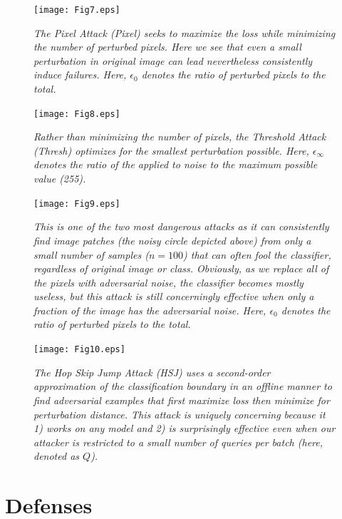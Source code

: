 \documentclass[journal]{IEEEtran}
\newcommand{\cm}[1]{\textit{{\color{blue}#1}}}
\begin{document}
\begin{figure}[] 
          \texttt{[image: Fig7.eps]}
        \caption{ \cm{The Pixel Attack (Pixel) seeks to maximize the loss while minimizing the number of perturbed pixels. Here we see that even a small  perturbation in original image can lead nevertheless consistently induce failures.  Here, $\epsilon_0$ denotes the ratio of perturbed pixels to the total.}}
        \label{fig:Pixel}
          \texttt{[image: Fig8.eps]}
        \caption{ \cm{Rather than minimizing the number of pixels, the Threshold Attack (Thresh) optimizes for the smallest perturbation possible. Here, $\epsilon_{\infty}$ denotes the ratio of the applied to noise to the maximum possible value (255).}}
        \label{fig:Thresh}
          \texttt{[image: Fig9.eps]}
        \caption{ \cm{ This is one of the two most dangerous attacks as it can consistently find image patches (the noisy circle depicted above) from only a small number of samples ($n=100$) that can often fool the classifier, regardless of original image or class. Obviously, as we replace all of the pixels with adversarial noise, the classifier becomes mostly useless, but this attack is still concerningly effective when only a fraction of the image has the adversarial noise. Here, $\epsilon_0$ denotes the ratio of perturbed pixels to the total.}}
        \label{fig:Patch}
          \texttt{[image: Fig10.eps]}
        \caption{ \cm{The Hop Skip Jump Attack (HSJ) uses a second-order approximation of the classification boundary in an offline manner to find adversarial examples that first maximize loss then minimize for perturbation distance. This attack is uniquely concerning because it 1) works on any model and 2) is surprisingly effective even when our attacker is restricted to a small number of queries per batch (here, denoted as $Q$).}}
        \label{fig:HSJ}
\end{figure}



\section{Defenses}
\label{defenses}
\end{document}
